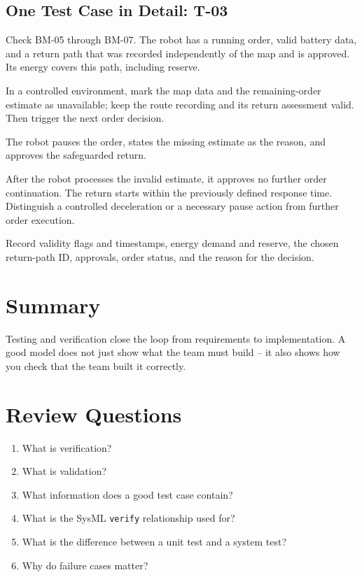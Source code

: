 \subsection{One Test Case in Detail: T-03}
\begin{description}[style=nextline]
    \item[Goal and preconditions] Check BM-05 through BM-07. The robot has a running order, valid battery data, and a return path that was recorded independently of the map and is approved. Its energy covers this path, including reserve.
    \item[Test setup and procedure] In a controlled environment, mark the map data and the remaining-order estimate as unavailable; keep the route recording and its return assessment valid. Then trigger the next order decision.
    \item[Expected result] The robot pauses the order, states the missing estimate as the reason, and approves the safeguarded return.
    \item[Pass/fail criterion] After the robot processes the invalid estimate, it approves no further order continuation. The return starts within the previously defined response time. Distinguish a controlled deceleration or a necessary pause action from further order execution.
    \item[Measurement data] Record validity flags and timestamps, energy demand and reserve, the chosen return-path ID, approvals, order status, and the reason for the decision.
\end{description}

\section{Summary}
Testing and verification close the loop from requirements to implementation. A good model does not just show what the team must build -- it also shows how you check that the team built it correctly.

\section{Review Questions}
\begin{enumerate}
    \item What is verification?
    \item What is validation?
    \item What information does a good test case contain?
    \item What is the SysML \texttt{verify} relationship used for?
    \item What is the difference between a unit test and a system test?
    \item Why do failure cases matter?
\end{enumerate}


